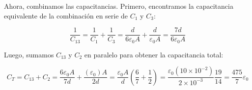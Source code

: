 \begin{problema}
\begin{sol}
    Ahora, combinamos las capacitancias. Primero, encontramos la capacitancia equivalente de la combinación en serie de $C_1$ y $C_3$:

$$\frac{1}{C_{13}} = \frac{1}{ C_1} + \frac{1}{C_3} = \frac{d}{6\varepsilon_0 A}+\frac{d}{\varepsilon_0A}=\frac{7d}{6\varepsilon_0A}$$

Luego, sumamos $C_{13}$ y $C_2$ en paralelo para obtener la capacitancia total:

$$C_{T} = C_{13} + C_2= \frac{6\varepsilon_0A}{7d }+\frac{(\varepsilon_0)A}{2d}=\frac{\varepsilon_0 A}{d}\left(\frac{6}{7}+\frac{1}{2}\right)= \frac{\varepsilon_0(10\times 10^{-2})}{2\times 10^{-3}} \frac{19}{14}=\frac{475}{7}\varepsilon_0 $$



\end{sol}
\end{problema}

